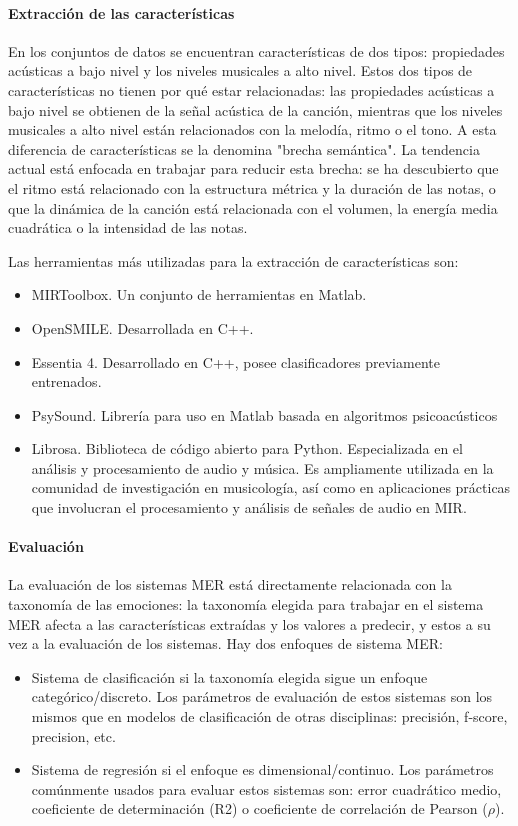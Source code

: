 \documentclass[12pt,a4paper,Spanish]{article}
\begin{document}
\paragraph{Extracción de las características}
En los conjuntos de datos se encuentran características de dos tipos: propiedades acústicas a bajo nivel y los niveles musicales a alto nivel. Estos dos tipos de características no tienen por qué estar relacionadas: las propiedades acústicas a bajo nivel se obtienen de la señal acústica de la canción, mientras que los niveles musicales a alto nivel están relacionados con la melodía, ritmo o el tono.
\newline
A esta diferencia de características se la denomina "brecha semántica". La tendencia actual está enfocada en trabajar para reducir esta brecha: se ha descubierto que el ritmo está relacionado con la estructura métrica y la duración de las notas, o que la dinámica de la canción está relacionada con el volumen, la energía media cuadrática o la intensidad de las notas.


Las herramientas más utilizadas para la extracción de características son:
\begin{itemize}
	\item MIRToolbox. Un conjunto de herramientas en Matlab.
	\item OpenSMILE. Desarrollada en C++.
	\item Essentia 4. Desarrollado en C++, posee clasificadores previamente entrenados.
	\item PsySound. Librería para uso en Matlab basada en algoritmos psicoacústicos
	\item Librosa. Biblioteca de código abierto para Python. Especializada en el análisis y procesamiento de audio y música. Es ampliamente utilizada en la comunidad de investigación en musicología, así como en aplicaciones prácticas que involucran el procesamiento y análisis de señales de audio en MIR.
\end{itemize}

\paragraph{Evaluación}
La evaluación de los sistemas MER está directamente relacionada con la taxonomía de las emociones: la taxonomía elegida para trabajar en el sistema MER afecta a las características extraídas y los valores a predecir, y estos a su vez a la evaluación de los sistemas. Hay dos enfoques de sistema MER:
\begin{itemize}
	\item Sistema de clasificación si la taxonomía elegida sigue un enfoque categórico/discreto. Los parámetros de evaluación de estos sistemas son los mismos que en modelos de clasificación de otras disciplinas: precisión, f-score, precision, etc.
	\item Sistema de regresión si el enfoque es dimensional/continuo. Los parámetros comúnmente usados para evaluar estos sistemas son: error cuadrático medio, coeficiente de determinación (R2) o coeficiente de correlación de Pearson ($\rho$).
\end{itemize}
\end{document}
